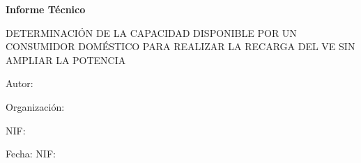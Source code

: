 \documentclass[a4paper,12pt]{article}
\let\OldTextField\TextField
\renewcommand{\TextField}[2][]{%
  \raisebox{-0.1ex}{\OldTextField[height=.95em,  bordercolor={1 1 1}, backgroundcolor={1 1 1},#1]{#2}}%
}
\begin{document}
\begin{Form}



\begin{titlepage}
    \centering
    {\scshape\LARGE  \par}
    \vspace{1cm}
    {\Huge\bfseries Informe Técnico\par}
    \vspace{2cm}
    {\Large DETERMINACIÓN DE LA CAPACIDAD DISPONIBLE POR UN CONSUMIDOR
    DOMÉSTICO PARA REALIZAR LA RECARGA DEL VE SIN AMPLIAR LA POTENCIA\par}
    \vspace{1cm}
    \vfill
    Autor: \TextField[name=Tecnico,width=6cm,default=Juan Pérez]{} \par
    Organización: \TextField[name=Organizacion,width=6cm,default=CalcAE]{} \par
    NIF: \TextField[name=NIF,width=6cm,default=12345678]{} \par
    Fecha:  NIF: \TextField[name=Fecha,width=6cm,default=\today]{} \par
\end{titlepage}

\begin{abstract}
  El texto del resumen debe estar de acuerdo con la Norma UNE 50103. En síntesis, debe ser tan informativo como lo
  permita la naturaleza del documento, para que los lectores puedan decidir si es necesario leer el documento completo;
  debe definir el objetivo, métodos, resultados y conclusiones presentadas en el documento original, bien en ese orden,
  o destacando inicialmente los resultados y conclusiones; debe constituir un texto completo, para que sea inteligible sin
  necesidad de referirse al documento. Debe ser conciso sin ser oscuro, reteniendo la información básica y el carácter
  del documento original. Los resúmenes de la mayoría de los informes deben tener menos de 250 palabras y en ningún
  caso más de 500; Deben estar escritos en un solo párrafo; emplear normalmente frases completas, verbos en forma
  activa y con tercera persona. No se deben utilizar figuras y símbolos, tales como tablas cortas y fórmulas, más que
  cuando no haya ninguna alternativa aceptable.\end{abstract}

\tableofcontents


\end{Form}
\end{document}
